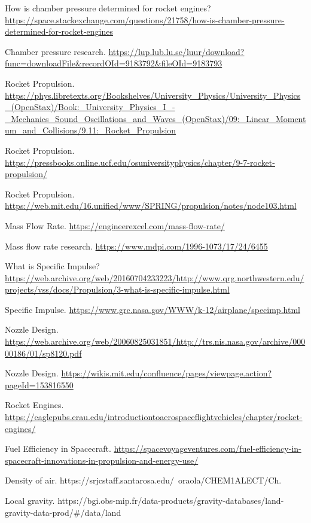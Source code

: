 \documentclass[12pt,a4paper]{article}
\begin{document}
\begin{thebibliography}{99}

How is chamber pressure determined for rocket engines? \url{https://space.stackexchange.com/questions/21758/how-is-chamber-pressure-determined-for-rocket-engines}

Chamber pressure research. \url{https://lup.lub.lu.se/luur/download?func=downloadFile&recordOId=9183792&fileOId=9183793}

Rocket Propulsion. \url{https://phys.libretexts.org/Bookshelves/University_Physics/University_Physics_(OpenStax)/Book:_University_Physics_I_-_Mechanics_Sound_Oscillations_and_Waves_(OpenStax)/09:_Linear_Momentum_and_Collisions/9.11:_Rocket_Propulsion}

Rocket Propulsion. \url{https://pressbooks.online.ucf.edu/osuniversityphysics/chapter/9-7-rocket-propulsion/}

Rocket Propulsion. \url{https://web.mit.edu/16.unified/www/SPRING/propulsion/notes/node103.html}

Mass Flow Rate. \url{https://engineerexcel.com/mass-flow-rate/}

Mass flow rate research. \url{https://www.mdpi.com/1996-1073/17/24/6455}

What is Specific Impulse? \url{https://web.archive.org/web/20160704233223/http://www.qrg.northwestern.edu/projects/vss/docs/Propulsion/3-what-is-specific-impulse.html}

Specific Impulse. \url{https://www.grc.nasa.gov/WWW/k-12/airplane/specimp.html}

Nozzle Design. \url{https://web.archive.org/web/20060825031851/http://trs.nis.nasa.gov/archive/00000186/01/sp8120.pdf}

Nozzle Design. \url{https://wikis.mit.edu/confluence/pages/viewpage.action?pageId=153816550}

Rocket Engines. \url{https://eaglepubs.erau.edu/introductiontoaerospaceflightvehicles/chapter/rocket-engines/}

Fuel Efficiency in Spacecraft. \url{https://spacevoyageventures.com/fuel-efficiency-in-spacecraft-innovations-in-propulsion-and-energy-use/}

Density of air. https://srjcstaff.santarosa.edu/~oraola/CHEM1ALECT/Ch.%

Local gravity. https://bgi.obs-mip.fr/data-products/gravity-databases/land-gravity-data-prod/#/data/land

\end{thebibliography}
\end{document}
